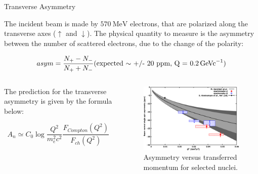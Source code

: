 \documentclass[9pt,a4paper]{beamer}
\begin{document}
\begin{frame}{Transverse Asymmetry}

The incident beam is made by $\SI{570}{\mega \electronvolt}$ electrons, that are polarized along the transverse axes ($\uparrow$ and $\downarrow$). The physical quantity to measure is the asymmetry between the number of scattered electrons, due to the change of the polarity:

\begin{equation}
asym = \frac{N_{+} - N_{-}}{N_{+} + N_{-}} \text{(expected $\sim$ +/- 20 ppm, Q = \SI{0.2}{\giga\electronvolt c^{-1}})}
\end{equation}

\begin{columns}[T]
\begin{column}{.5\textwidth}

The prediction for the transverse asymmetry is given by the formula below:

\begin{equation}
A_{n} \simeq C_{0} \log \frac{Q^{2}}{m^2_e c^2} \frac{F_{Compton} (Q^2)}{F_{ch}(Q^2)}
\end{equation}
\end{column}
\begin{column}{.5\textwidth}
\centering
\begin{figure}
\includegraphics[width = \textwidth]{figures/medium.png}
\caption{Asymmetry versus transferred momentum for selected nuclei.}
\end{figure}
\end{column}
\end{columns}

\end{frame}
\end{document}
